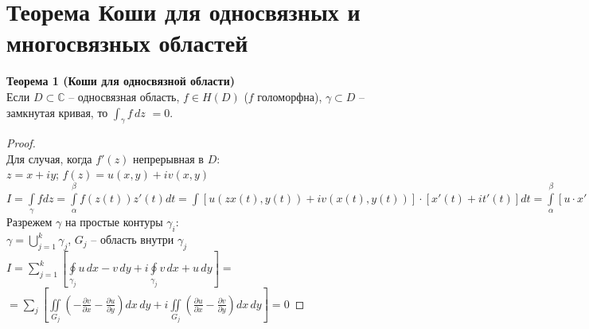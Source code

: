 \newpage
\section{Теорема Коши для односвязных и многосвязных областей}
\textbf{Теорема 1 (Коши для односвязной области)}\\
Если $D \subset \mathbb{C}$ -- односвязная область, $f \in H(D)$ ($f$ голоморфна), $\gamma \subset D$ -- замкнутая кривая, то \(\int_{\gamma} f\, dz\) $= 0$.


\begin{proof}
    \ \\
    Для случая, когда $f'(z)$ непрерывная в $D$:\\
    $z=x+iy$; $f(z)=u(x,y)+iv(x,y)$\\
    $I = \int\limits_{\gamma}fdz = \int\limits_{\alpha}^{\beta}f(z(t))z'(t)dt = \int[u(zx(t),y(t))+iv(x(t), y(t))]\cdot [x'(t)+it'(t)]dt = \int\limits_{\alpha}^{\beta}[u\cdot x'-v\cdot y')+i(uy'+vx')]dt=\int\limits_{\alpha}^{\beta}(ux'-vy')dt+i\int\limits_{\alpha}^{\beta}(uy'+vx')dt = \int\limits_{\gamma}udx-vdy +i\int\limits_{\gamma}udy+vdx=$
    Разрежем $\gamma$ на простые контуры $\gamma_i$:\\
    $\gamma=\bigcup\limits_{j=1}^{k}\gamma_j$, $G_j$ -- область внутри $\gamma_j$\\
    $I = \sum_{j=1}^k \left[ \oint\limits_{\gamma_j}u\,dx-v\,dy+i\oint\limits_{\gamma_j}v\,dx+u\,dy \right] =$\\
    $= \sum_j \left[ \iint\limits_{G_j}\left(-\frac{\partial v}{\partial x}-\frac{\partial u}{\partial y} \right)dx\,dy + i\iint\limits_{G_j}\left(\frac{\partial u}{\partial x}-\frac{\partial v}{\partial y} \right)dx\,dy \right] = 0$
\end{proof}


